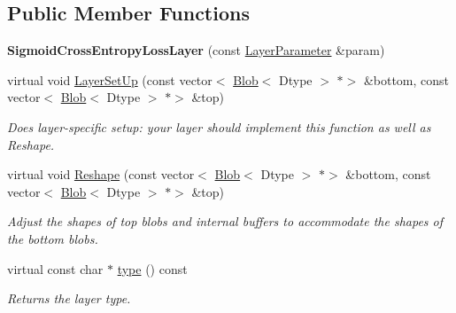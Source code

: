 \subsection*{Public Member Functions}
\begin{DoxyCompactItemize}
\item 
\mbox{\label{classcaffe_1_1_sigmoid_cross_entropy_loss_layer_a3b4478b3d5c5130de685b240b274c06c}} 
{\bfseries Sigmoid\+Cross\+Entropy\+Loss\+Layer} (const \mbox{\hyperlink{classcaffe_1_1_layer_parameter}{Layer\+Parameter}} \&param)
\item 
virtual void \mbox{\hyperlink{classcaffe_1_1_sigmoid_cross_entropy_loss_layer_aa1535140dd4eb94557c3afc89076d56d}{Layer\+Set\+Up}} (const vector$<$ \mbox{\hyperlink{classcaffe_1_1_blob}{Blob}}$<$ Dtype $>$ $\ast$$>$ \&bottom, const vector$<$ \mbox{\hyperlink{classcaffe_1_1_blob}{Blob}}$<$ Dtype $>$ $\ast$$>$ \&top)
\begin{DoxyCompactList}\small\item\em Does layer-\/specific setup\+: your layer should implement this function as well as Reshape. \end{DoxyCompactList}\item 
virtual void \mbox{\hyperlink{classcaffe_1_1_sigmoid_cross_entropy_loss_layer_a305423abeea4bd1652ff7e696aaba808}{Reshape}} (const vector$<$ \mbox{\hyperlink{classcaffe_1_1_blob}{Blob}}$<$ Dtype $>$ $\ast$$>$ \&bottom, const vector$<$ \mbox{\hyperlink{classcaffe_1_1_blob}{Blob}}$<$ Dtype $>$ $\ast$$>$ \&top)
\begin{DoxyCompactList}\small\item\em Adjust the shapes of top blobs and internal buffers to accommodate the shapes of the bottom blobs. \end{DoxyCompactList}\item 
\mbox{\label{classcaffe_1_1_sigmoid_cross_entropy_loss_layer_a38dd36e04f37f4692446b057a48e96e1}} 
virtual const char $\ast$ \mbox{\hyperlink{classcaffe_1_1_sigmoid_cross_entropy_loss_layer_a38dd36e04f37f4692446b057a48e96e1}{type}} () const
\begin{DoxyCompactList}\small\item\em Returns the layer type. \end{DoxyCompactList}\item 
\mbox{\label{classcaffe_1_1_sigmoid_cross_entropy_loss_layer_a3b4478b3d5c5130de685b240b274c06c}} 

\end{DoxyCompactItemize}

